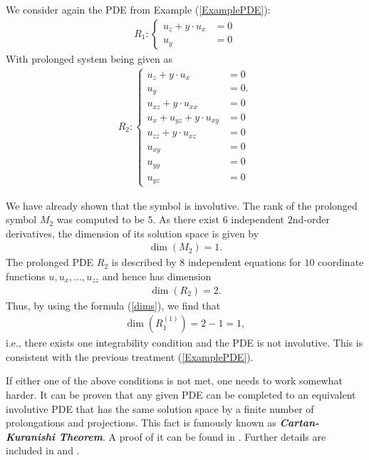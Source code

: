 \begin{example}
We consider again the PDE from Example (\ref{ExamplePDE}):
\begin{align}
    R_1 : \begin{cases} u_z + y \cdot u_x &= 0\\
                        u_y &= 0
            \end{cases}
\end{align}
With prolonged system being given as
\begin{align}
    R_2 : \begin{cases} u_z + y \cdot u_x &= 0 \\
                        u_y &= 0. \\
                        u_{xz} + y \cdot u_{xx} &= 0 \\
                        u_x + u_{yz} + y \cdot u_{xy} &= 0 \\
                        u_{zz} + y \cdot u_{xz} &= 0 \\
                        u_{xy} &= 0 \\
                        u_{yy} &= 0 \\
                        u_{yz} &= 0 
            \end{cases}
\end{align}

We have already shown that the symbol is involutive. 
The rank of the prolonged symbol $M_2$ was computed to be $5$. As there exist $6$ independent $2$nd-order derivatives, the dimension of its solution space is given by
\begin{align}
    \operatorname{dim}(M_2) = 1.
\end{align}
The prolonged PDE $R_2$ is described by $8$ independent equations for $10$ coordinate functions $u,u_x,...,u_{zz}$ and hence has dimension
\begin{align}
    \operatorname{dim}(R_2) = 2.
\end{align}
Thus, by using the formula (\ref{dims}), we find that
\begin{align}
    \operatorname{dim}(R_1^{(1)}) = 2 - 1 = 1,
\end{align}
i.e., there exists one integrability condition and the PDE is not involutive. This is consistent with the previous treatment (\ref{ExamplePDE}).
\end{example}


If either one of the above conditions is not met, one needs to work somewhat harder. It can be proven that any given PDE can be completed to an equivalent involutive PDE that has the same solution space by a finite number of prolongations and projections. This fact is famously known as \textbf{\textit{Cartan-Kuranishi Theorem}}. A proof of it can be found in \cite{sweeney1968}. Further details are included in \cite{seiler2009involution} and \cite{seiler1994analysis}.

